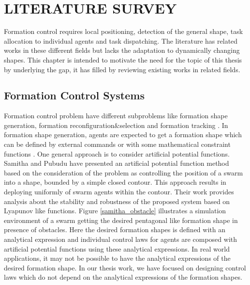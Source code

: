 

\chapter{LITERATURE SURVEY}
\label{chp:Literature Survey}







Formation control requires local positioning, detection of the general shape, task allocation to individual agents and task dispatching. The literature has related works in these different fields but lacks the adaptation to dynamically changing shapes. This chapter is intended to motivate the need for the topic of this thesis by underlying the gap, it has filled by reviewing existing works in related fields. 

\section{Formation Control Systems}
Formation control problem have different subproblems like formation shape generation, formation reconfiguration$\&$selection and formation tracking \cite{12}.  
In formation shape generation, agents are expected to get a formation shape which can be defined by external commands or with some mathematical constraint functions \cite{16}.  One general approach is to consider artificial potential functions. Samitha and Pubudu \cite{17} have presented an artificial potential function method  based on the consideration of the problem as controlling the position of a swarm into a shape, bounded by a simple closed contour. This approach results in deploying uniformly of swarm agents within the contour.  Their work provides analysis about the stability and robustness of the proposed system based on Lyapunov like functions. Figure \ref{samitha_obstacle} illustrates a simulation environment of a swarm getting the desired pentagonal like formation shape in presence of obstacles. Here the desired formation shapes is defined with an analytical expression and individual control laws for agents are composed with artificial potential functions using these analytical expressions. In real world applications, it may not be possible to have the analytical expressions of the desired formation shape. In our thesis work, we have focused on designing control laws which do not depend on the analytical expressions of the formation shapes.

